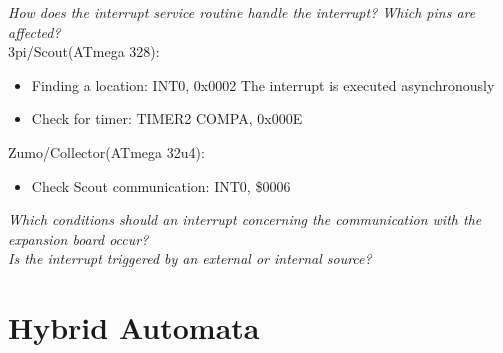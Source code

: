 \documentclass[12pt]{article}
\begin{document}
\flushleft
\textit{How does the interrupt service routine handle the interrupt? Which pins are affected?} \\

3pi/Scout(ATmega 328): \\
\begin{itemize}
\item Finding a location: INT0, 0x0002
The interrupt is executed asynchronously 
\item Check for timer: TIMER2 COMPA, 0x000E 
\end{itemize}
Zumo/Collector(ATmega 32u4): \\
\begin{itemize}
\item Check Scout communication: INT0, \$0006
\end{itemize}

\textit{Which conditions should an interrupt concerning the communication with the expansion board occur?} \\
\textit{Is the interrupt triggered by an external or internal source?} \\

\section*{Hybrid Automata}
\end{document}
